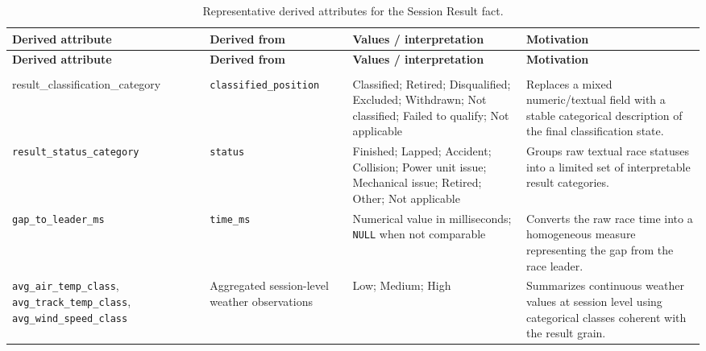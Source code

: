 \documentclass[11pt,a4paper]{article}
\begin{document}
	
	{\footnotesize
		\renewcommand{\arraystretch}{1.15}
		
		\begin{longtable}{
				>{\raggedright\arraybackslash}p{3.4cm}
				>{\raggedright\arraybackslash}p{3.0cm}
				>{\raggedright\arraybackslash}p{3.8cm}
				>{\raggedright\arraybackslash}p{6.1cm}
			}
			\caption{Representative derived attributes for the Session Result fact.}
			\label{tab:result-derived-representative} \\
			
			\toprule
			\textbf{Derived attribute}
			& \textbf{Derived from}
			& \textbf{Values / interpretation}
			& \textbf{Motivation} \\
			\midrule
			\endfirsthead
			
			\toprule
			\textbf{Derived attribute}
			& \textbf{Derived from}
			& \textbf{Values / interpretation}
			& \textbf{Motivation} \\
			\midrule
			\endhead
			
			\midrule
			\multicolumn{4}{r}{\emph{Continued on next page}} \\
			\endfoot
			
			\bottomrule
			\endlastfoot
			
			{\scriptsize result\_classification\_category}
			& \texttt{classified\_position}
			& Classified; Retired; Disqualified; Excluded; Withdrawn; Not classified; Failed to qualify; Not applicable
			& Replaces a mixed numeric/textual field with a stable categorical description of the final classification state. \\
			
			\midrule
			
			{\scriptsize\texttt{result\_status\_category}}
			& \texttt{status}
			& Finished; Lapped; Accident; Collision; Power unit issue; Mechanical issue; Retired; Other; Not applicable
			& Groups raw textual race statuses into a limited set of interpretable result categories. \\
			
			\midrule
			
			\texttt{gap\_to\_leader\_ms}
			& \texttt{time\_ms}
			& Numerical value in milliseconds; \texttt{NULL} when not comparable
			& Converts the raw race time into a homogeneous measure representing the gap from the race leader. \\
			
			\midrule
			
			{\scriptsize\texttt{avg\_air\_temp\_class}, \texttt{avg\_track\_temp\_class}, \texttt{avg\_wind\_speed\_class}}
			& Aggregated session-level weather observations
			& Low; Medium; High
			& Summarizes continuous weather values at session level using categorical classes coherent with the result grain. \\
			

\end{longtable}}
\end{document}
